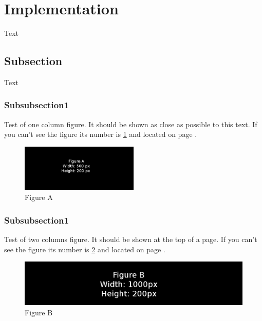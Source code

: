 \section{Implementation}\label{sec:implementation}
Text

\subsection{Subsection}
Text
\subsubsection{Subsubsection1}
Test of one column figure. It should be shown as close as possible to this
text. If you can't see the figure its number is \ref{fig:one_column_figure}
and located on page \pageref{fig:one_column_figure}.
\begin{figure}[ht]
    \includegraphics[width=0.5\textwidth]{./figure/figureA.png}
    \caption{Figure A}
    \label{fig:one_column_figure}
\end{figure}

\subsubsection{Subsubsection1}
Test of two columns figure. It should be shown at the top of a page. If you
can't see the figure its number is \ref{fig:two_column_figure}
and located on page \pageref{fig:two_column_figure}.
\begin{figure}[t]
    \includegraphics[width=1.0\textwidth]{./figure/figureB.png}
    \caption{Figure B}
    \label{fig:two_column_figure}
\end{figure}
